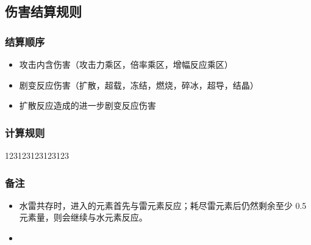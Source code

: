 \documentclass[a4paper,12pt]{article}
\begin{document}
    \subsection{伤害结算规则}

    \subsubsection{结算顺序}

    \begin{itemize}
        \item 攻击内含伤害（攻击力乘区，倍率乘区，增幅反应乘区）
        \item 剧变反应伤害（扩散，超载，冻结，燃烧，碎冰，超导，结晶）
        \item 扩散反应造成的进一步剧变反应伤害
    \end{itemize}
    
    \subsubsection{计算规则}

    123123123123123

    \subsubsection{备注}

    \begin{itemize}
        \item 水雷共存时，进入的元素首先与雷元素反应；耗尽雷元素后仍然剩余至少 0.5 元素量，则会继续与水元素反应。
        \item 
    \end{itemize}
\end{document}
